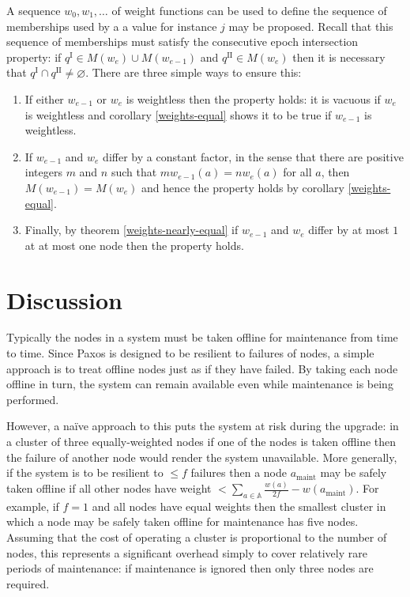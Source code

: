 \documentclass[journal]{IEEEtran}
\begin{document}
A sequence $w_0, w_1, \ldots$ of weight functions can be used to define the
sequence of memberships used by a  a value for instance $j$ may be proposed.
Recall that this sequence of memberships must satisfy the consecutive epoch
intersection property: if $q^\textrm{I} \in M(w_e) \cup M(w_{e-1})$ and
$q^\textrm{II} \in M(w_e)$ then it is necessary that $q^\textrm{I} \cap
q^\textrm{II} \ne \varnothing$. There are three simple ways to ensure this:

\begin{enumerate}

\item If either $w_{e-1}$ or $w_e$ is weightless then the property holds: it is
vacuous if $w_e$ is weightless and corollary \ref{weights-equal} shows it to be
true if $w_{e-1}$ is weightless.

\item If $w_{e-1}$ and $w_e$ differ by a constant factor, in the sense that
there are positive integers $m$ and $n$ such that $m w_{e-1}(a) = n w_e(a)$ for
all $a$, then $M(w_{e-1}) = M(w_e)$ and hence the property holds by corollary
\ref{weights-equal}.

\item Finally, by theorem \ref{weights-nearly-equal} if $w_{e-1}$ and $w_e$
differ by at most $1$ at at most one node then the property holds.

\end{enumerate}

\section{Discussion}

Typically the nodes in a system must be taken offline for maintenance from time
to time. Since Paxos is designed to be resilient to failures of nodes, a simple
approach is to treat offline nodes just as if they have failed. By taking each
node offline in turn, the system can remain available even while maintenance is
being performed.

However, a na\"ive approach to this puts the system at risk during the upgrade:
in a cluster of three equally-weighted nodes if one of the nodes is taken
offline then the failure of another node would render the system unavailable.
More generally, if the system is to be resilient to $\le f$ failures then a
node $a_{\textrm{maint}}$ may be safely taken offline if all other nodes have
weight $< \sum_{a \in \mathbb A} \frac{w(a)}{2f} - w(a_{\textrm{maint}})$. For
example, if $f = 1$ and all nodes have equal weights then the smallest cluster
in which a node may be safely taken offline for maintenance has five nodes.
Assuming that the cost of operating a cluster is proportional to the number of
nodes, this represents a significant overhead simply to cover relatively rare
periods of maintenance: if maintenance is ignored then only three nodes are
required.
\end{document}
